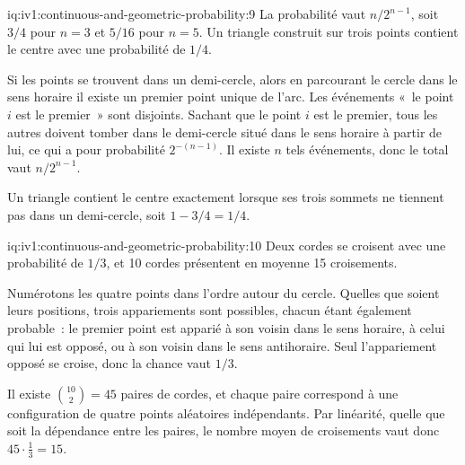 \begin{solution}{iq:iv1:continuous-and-geometric-probability:9}
La probabilité vaut $n/2^{n - 1}$, soit $3/4$ pour $n = 3$ et $5/16$ pour $n = 5$. Un triangle construit sur trois points contient le centre avec une probabilité de $1/4$.

Si les points se trouvent dans un demi-cercle, alors en parcourant le cercle dans le sens horaire il existe un premier point unique de l'arc. Les événements «~le point $i$ est le premier~» sont disjoints. Sachant que le point $i$ est le premier, tous les autres doivent tomber dans le demi-cercle situé dans le sens horaire à partir de lui, ce qui a pour probabilité $2^{-(n - 1)}$. Il existe $n$ tels événements, donc le total vaut $n/2^{n - 1}$.

Un triangle contient le centre exactement lorsque ses trois sommets ne tiennent pas dans un demi-cercle, soit $1 - 3/4 = 1/4$.

\end{solution}

\begin{solution}{iq:iv1:continuous-and-geometric-probability:10}
Deux cordes se croisent avec une probabilité de $1/3$, et 10 cordes présentent en moyenne 15 croisements.

Numérotons les quatre points dans l'ordre autour du cercle. Quelles que soient leurs positions, trois appariements sont possibles, chacun étant également probable~: le premier point est apparié à son voisin dans le sens horaire, à celui qui lui est opposé, ou à son voisin dans le sens antihoraire. Seul l'appariement opposé se croise, donc la chance vaut $1/3$.

Il existe $\binom{10}{2} = 45$ paires de cordes, et chaque paire correspond à une configuration de quatre points aléatoires indépendants. Par linéarité, quelle que soit la dépendance entre les paires, le nombre moyen de croisements vaut donc $45 \cdot \tfrac13 = 15$.

\end{solution}


